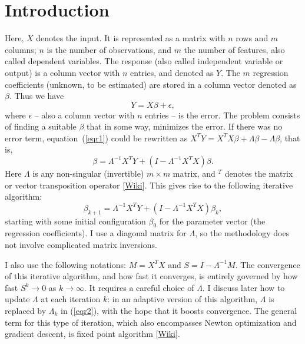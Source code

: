 \documentclass[oneside,10pt]{book}
\begin{document}
\hypersetup{linkcolor=red}

\section{Introduction}\label{regi1}

Here, $X$ denotes the input. It is represented as a matrix with $n$ rows and $m$ columns; $n$ is the number of observations, and $m$ the number of 
features, also called dependent variables. The response (also called independent variable or output) is a column vector with $n$ entries, and denoted as $Y$. The $m$ regression coefficients (unknown, to be estimated) are stored in a column vector denoted as $\beta$. Thus we have
\begin{equation}
Y=X\beta +\epsilon, \label{eqr1}
\end{equation} 
where $\epsilon$ -- also a column vector with $n$ entries -- is the error. The problem consists of finding a suitable $\beta$ that in some way, minimizes the error. If there was no error term, equation~(\ref{eqr1}) could be rewritten as $X^TY=X^T X\beta + \Lambda\beta - \Lambda\beta$, that is, 
$$\beta=\Lambda^{-1}X^TY +(I-\Lambda^{-1}X^TX)\beta.$$
Here $\Lambda$ is any non-singular (invertible) $m\times m$ matrix, and $ ^T$ denotes the matrix or vector transposition operator [\href{https://en.wikipedia.org/wiki/Transpose}{Wiki}]. This gives rise to the following iterative algorithm:
\begin{equation}
\beta_{k+1}=\Lambda^{-1}X^TY +(I-\Lambda^{-1}X^TX)\beta_k,\label{eqr2}
\end{equation}
starting with some initial configuration $\beta_0$ for the parameter vector (the regression coefficients). I use a diagonal matrix for $\Lambda$, so the methodology does not involve complicated matrix inversions. 

I also use the following notations: $M=X^TX$ and $S=I-\Lambda^{-1}M$. The convergence of this iterative algorithm, and how fast it converges, is entirely governed by
how fast $S^k\rightarrow 0$ as $k\rightarrow\infty$. It requires a careful choice of $\Lambda$. I discuss later how to update $\Lambda$ at each iteration $k$: in an adaptive version of this algorithm, $\Lambda$ is replaced by $\Lambda_k$ in (\ref{eqr2}), with the hope that it boosts convergence. The general term for this type of iteration, which also encompasses Newton optimization and gradient descent, is \textcolor{index}{fixed point algorithm} [\href{https://en.wikipedia.org/wiki/Fixed-point_iteration}{Wiki}].
\end{document}
